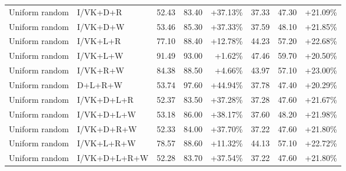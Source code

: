 \documentclass[UTF8,10pt]{ctexart}
\newcommand{\better}[1]{\textcolor{goodblue}{#1}}
\begin{document}
{\begin{longtable}{llrrrrrr}
Uniform random & I/VK+D+R & 52.43 & 83.40 & \better{+37.13\%} & 37.33 & 47.30 & \better{+21.09\%}\\
Uniform random & I/VK+D+W & 53.46 & 85.30 & \better{+37.33\%} & 37.59 & 48.10 & \better{+21.85\%}\\
Uniform random & I/VK+L+R & 77.10 & 88.40 & \better{+12.78\%} & 44.23 & 57.20 & \better{+22.68\%}\\
Uniform random & I/VK+L+W & 91.49 & 93.00 & \better{+1.62\%} & 47.46 & 59.70 & \better{+20.50\%}\\
Uniform random & I/VK+R+W & 84.38 & 88.50 & \better{+4.66\%} & 43.97 & 57.10 & \better{+23.00\%}\\
Uniform random & D+L+R+W & 53.74 & 97.60 & \better{+44.94\%} & 37.78 & 47.40 & \better{+20.29\%}\\
Uniform random & I/VK+D+L+R & 52.37 & 83.50 & \better{+37.28\%} & 37.28 & 47.60 & \better{+21.67\%}\\
Uniform random & I/VK+D+L+W & 53.18 & 86.00 & \better{+38.17\%} & 37.60 & 48.20 & \better{+21.98\%}\\
Uniform random & I/VK+D+R+W & 52.33 & 84.00 & \better{+37.70\%} & 37.22 & 47.60 & \better{+21.80\%}\\
Uniform random & I/VK+L+R+W & 78.57 & 88.60 & \better{+11.32\%} & 44.13 & 57.10 & \better{+22.72\%}\\
Uniform random & I/VK+D+L+R+W & 52.28 & 83.70 & \better{+37.54\%} & 37.22 & 47.60 & \better{+21.80\%}\\

\bottomrule
\end{longtable}
}
\end{document}
